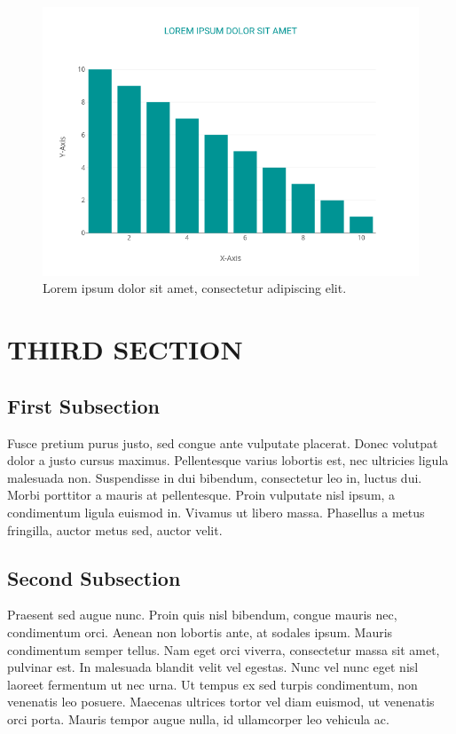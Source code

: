 \documentclass[a4paper,margin=1in]{article}
\begin{document}
\begin{figure}[h]
    \centering
    \includegraphics[height=0.25\textheight,keepaspectratio]{sample_graph.png}
    \caption{Lorem ipsum dolor sit amet, consectetur adipiscing elit.}
    \label{fig:sat}
\end{figure}


\section{THIRD SECTION}
\subsection{First Subsection}

Fusce pretium purus justo, sed congue ante vulputate placerat. Donec volutpat dolor a justo cursus maximus. Pellentesque varius lobortis est, nec ultricies ligula malesuada non. Suspendisse in dui bibendum, consectetur leo in, luctus dui. Morbi porttitor a mauris at pellentesque. Proin vulputate nisl ipsum, a condimentum ligula euismod in. Vivamus ut libero massa. Phasellus a metus fringilla, auctor metus sed, auctor velit.\\


\subsection{Second Subsection}

Praesent sed augue nunc. Proin quis nisl bibendum, congue mauris nec, condimentum orci. Aenean non lobortis ante, at sodales ipsum. Mauris condimentum semper tellus. Nam eget orci viverra, consectetur massa sit amet, pulvinar est. In malesuada blandit velit vel egestas. Nunc vel nunc eget nisl laoreet fermentum ut nec urna. Ut tempus ex sed turpis condimentum, non venenatis leo posuere. Maecenas ultrices tortor vel diam euismod, ut venenatis orci porta. Mauris tempor augue nulla, id ullamcorper leo vehicula ac.\\
\end{document}
